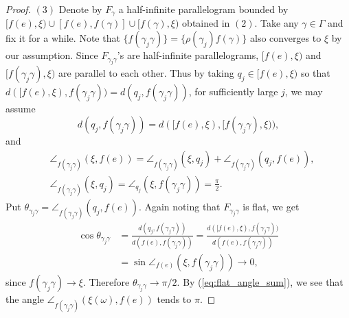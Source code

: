 \documentclass[12pt]{amsart}
\numberwithin{equation}{section}
\theoremstyle{plain}
\theoremstyle{definition}
\theoremstyle{remark}
\begin{document}
\begin{proof}
$(3)$
Denote by $F_{\gamma}$ a half-infinite parallelogram bounded by
$[f(e),\xi) \cup [f(e),f(\gamma)] \cup [f(\gamma),\xi)$ 
obtained in $(2)$. 
Take any $\gamma \in \Gamma$ and fix it for a while.  Note that 
$\{f(\gamma_j\gamma)\}=\{\rho(\gamma_j)f(\gamma)\}$ also converges to
$\xi$ by our assumption. 
Since $F_{\gamma_j\gamma}$'s are half-infinite parallelograms,
$[f(e),\xi)$ and $[f(\gamma_j\gamma),\xi)$ are 
parallel to each other. 
Thus by taking $q_j \in [f(e), \xi)$ so that 
$d([f(e), \xi), f(\gamma_j\gamma))=d(q_j, f(\gamma_j\gamma))$, for
sufficiently large $j$, we may assume
\begin{equation*}
 d(q_j, f(\gamma_j\gamma))
 =d([f(e), \xi), [f(\gamma_j\gamma), \xi)), 
\end{equation*}
and 
\begin{equation}
\label{eq:flat_angle_sum}
\begin{split}
  & \angle_{f(\gamma_j\gamma)}(\xi, f(e))
  = \angle_{f(\gamma_j\gamma)}(\xi, q_j) + 
    \angle_{f(\gamma_j\gamma)}(q_j, f(e)), \\
 & \angle_{f(\gamma_j\gamma)}(\xi, q_j) =
 \angle_{q_j} (\xi, f(\gamma_j\gamma))=\frac{\pi}{2} . 
\end{split}
\end{equation}
Put 
$\theta_{\gamma_j\gamma}= \angle_{f(\gamma_j\gamma)}(q_j, f(e))$.  
Again noting that $F_{\gamma_j\gamma}$ is flat, we get 
\begin{equation*}
\begin{split}
  \cos \theta_{\gamma_j\gamma}& =
 \frac{d(q_j, f(\gamma_j\gamma))}{d(f(e),f(\gamma_j\gamma))}= 
 \frac{d([f(e), \xi),
 f(\gamma_j\gamma))}{d(f(e),f(\gamma_j\gamma))} \\
  & = \sin \angle_{f(e)}(\xi, f(\gamma_j\gamma))\to 0, 
\end{split}
\end{equation*}
since $f(\gamma_j\gamma) \to \xi$.
Therefore $\theta_{\gamma_j\gamma}\to \pi/2$.
By (\ref{eq:flat_angle_sum}), we see that the angle 
$\angle_{f(\gamma_j\gamma)}(\xi(\omega), f(e))$ tends to $\pi$.


\end{proof}
\end{document}
